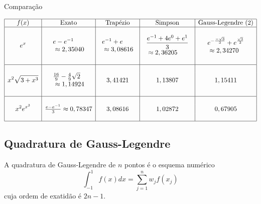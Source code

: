 \begin{ex} Comparação
  \begin{small}
$$
\begin{array}{|c|c|c|c|c|}
\hline
f(x)&\hbox{Exato}&\hbox{Trapézio} &\hbox{Simpson} & \hbox{Gauss-Legendre (2)}\\
\hline
&&&&\\
\displaystyle e^{x}&\displaystyle \begin{array}{l}e-e^{-1}\\~\approx 2,35040\end{array}  & \displaystyle \begin{array}{l}e^{-1}+e \\ ~\approx 3,08616 \end{array}& \begin{array}{l}\displaystyle \frac{e^{-1}+4e^{0}+e^{1}}{3}\\ ~\approx  2,36205\end{array} & \begin{array}{l}\displaystyle e^{-\frac{-\sqrt{3}}{3}}+e^{\frac{\sqrt{3}}{3}}\\ ~\approx   2,34270\end{array}\\
&&&&\\
 \hline
&&&&\\
\displaystyle x^2\sqrt{3+x^3}& \begin{array}{l}\frac{16}{9}-\frac{4}{9}\sqrt{2}\\~\approx 1,14924\end{array} & 3,41421  & 1,13807 & 1,15411\\
&&&&\\
 \hline
&&&&\\
  \displaystyle x^2e^{x^3}&\frac{e-e^{-1}}{3}\approx 0,78347 & 3,08616     & 1,02872  & 0,67905\\
&&&&\\
 \hline
    \end{array}
$$    
  \end{small}
\end{ex}

\subsection{Quadratura de Gauss-Legendre}

A quadratura de Gauss-Legendre de $n$ pontos é o esquema numérico
$$\int_{-1}^1 f(x)dx =\sum_{j=1}^n w_j f(x_j)$$
cuja ordem de exatidão é $2n-1$.

